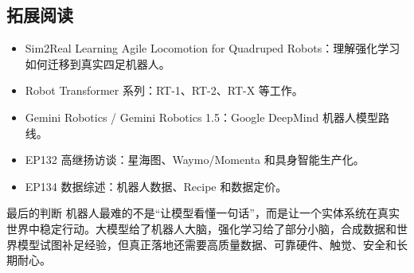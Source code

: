 \subsection{拓展阅读}

\begin{itemize}
\item Sim2Real Learning Agile Locomotion for Quadruped Robots：理解强化学习如何迁移到真实四足机器人。
\item Robot Transformer 系列：RT-1、RT-2、RT-X 等工作。
\item Gemini Robotics / Gemini Robotics 1.5：Google DeepMind 机器人模型路线。
\item EP132 高继扬访谈：星海图、Waymo/Momenta 和具身智能生产化。
\item EP134 数据综述：机器人数据、Recipe 和数据定价。
\end{itemize}

\begin{importantbox}{最后的判断}
机器人最难的不是“让模型看懂一句话”，而是让一个实体系统在真实世界中稳定行动。大模型给了机器人大脑，强化学习给了部分小脑，合成数据和世界模型试图补足经验，但真正落地还需要高质量数据、可靠硬件、触觉、安全和长期耐心。
\end{importantbox}


